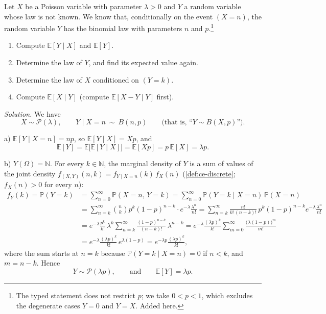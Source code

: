 \begin{example}\label{exa:cp-thinning}
Let $X$ be a Poisson variable with parameter $\lambda>0$ and $Y$ a random variable whose law is
not known. We know that, conditionally on the event $(X=n)$, the random variable $Y$ has the
binomial law with parameters $n$ and $p$.\footnote{The typed statement does not restrict $p$;
we take $0<p<1$, which excludes the degenerate cases $Y=0$ and $Y=X$. Added here.}
\begin{enumerate}[label=\alph*)]
  \item Compute $\mathbb E[Y\mid X]$ and $\mathbb E[Y]$.
  \item Determine the law of $Y$, and find its expected value again.
  \item Determine the law of $X$ conditioned on $(Y=k)$.
  \item Compute $\mathbb E[X\mid Y]$ (compute $\mathbb E[X-Y\mid Y]$ first).
\end{enumerate}

\emph{Solution.} We have
\[
  X\sim\mathcal P(\lambda),\qquad Y\mid X=n\ \sim\ B(n,p)\qquad\text{(that is, ``$Y\sim B(X,p)$'')}.
\]

a) $\mathbb E[Y\mid X=n]=np$, so $\mathbb E[Y\mid X]=Xp$, and
\[
  \mathbb E[Y]=\mathbb E\big[\mathbb E[Y\mid X]\big]=\mathbb E[Xp]=p\,\mathbb E[X]=\lambda p .
\]

b) $Y(\Omega)=\mathbb N$. For every $k\in\mathbb N$, the marginal density of $Y$ is a sum of
values of the joint density $f_{(X,Y)}(n,k)=f_{Y\mid X=n}(k)\,f_X(n)$ (\cref{def:ce-discrete};
$f_X(n)>0$ for every $n$):
\[
\begin{aligned}
  f_Y(k)=\mathbb P(Y=k)&=\sum_{n=0}^\infty\mathbb P(X=n,\,Y=k)=\sum_{n=0}^\infty\mathbb P(Y=k\mid X=n)\,\mathbb P(X=n)\\
  &=\sum_{n=k}^\infty\binom nkp^k(1-p)^{n-k}\cdot e^{-\lambda}\frac{\lambda^n}{n!}
  =\sum_{n=k}^\infty\frac{n!}{k!\,(n-k)!}\,p^k(1-p)^{n-k}e^{-\lambda}\frac{\lambda^n}{n!}\\
  &=e^{-\lambda}\frac{p^k}{k!}\,\lambda^k\sum_{n=k}^\infty\frac{(1-p)^{n-k}}{(n-k)!}\,\lambda^{n-k}
  =e^{-\lambda}\frac{(\lambda p)^k}{k!}\sum_{m=0}^\infty\frac{\big(\lambda(1-p)\big)^m}{m!}\\
  &=e^{-\lambda}\frac{(\lambda p)^k}{k!}\,e^{\lambda(1-p)}=e^{-\lambda p}\frac{(\lambda p)^k}{k!},
\end{aligned}
\]
where the sum starts at $n=k$ because $\mathbb P(Y=k\mid X=n)=0$ if $n<k$, and $m=n-k$. Hence
\[
  Y\sim\mathcal P(\lambda p),\qquad\text{and}\qquad\mathbb E[Y]=\lambda p .
\]


\end{example}
